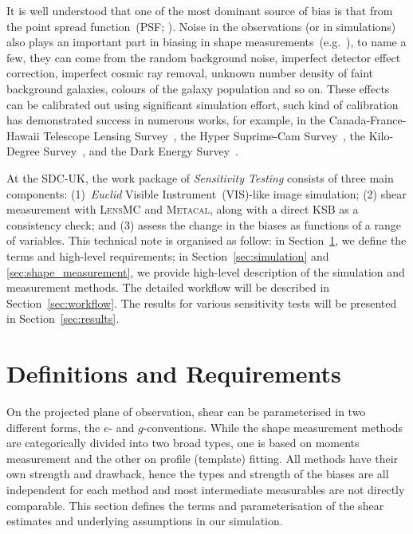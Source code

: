 \documentclass[11pt]{EuclidVIS}
\numberwithin{table}{section}
\numberwithin{figure}{section}
\begin{document}
It is well understood that one of the most dominant source of bias is that from the point spread
function~(PSF; \citealp{2008A&A...484...67P, 2013MNRAS.429..661M}). Noise in the observations (or
in simulations) also plays an important part in biasing in shape measurements~(e.g.\ \citealp{2012MNRAS.424.2757M}),
to name a few, they can come from the random background noise, imperfect detector effect correction,
imperfect cosmic ray removal, unknown number density of faint background galaxies, colours of the
galaxy population and so on. These effects can be calibrated out using significant simulation effort,
such kind of calibration has demonstrated success in numerous works, for example, in the
Canada-France-Hawaii Telescope Lensing Survey~\citep{2013MNRAS.429.2858M}, the Hyper Suprime-Cam
Survey~\citep{2018MNRAS.481.3170M}, the Kilo-Degree Survey~\citep{2021A&A...645A.105G}, and the
Dark Energy Survey~\citep{2022MNRAS.509.3371M}.

At the SDC-UK, the work package of \textit{Sensitivity Testing} consists of three main components:
(1)~\textit{Euclid} Visible Instrument~(VIS)-like image simulation; (2) shear measurement with
\textsc{LensMC} and \textsc{Metacal}, along with a direct \textsc{KSB} as
a consistency check; and (3) assess the change in the biases as functions of a range of variables.
This technical note is organised as follow: in Section~\ref{sec:definition_and_requirement}, we 
define the terms and high-level requirements; in Section~\ref{sec:simulation} and \ref{sec:shape_measurement},
we provide high-level description of the simulation and measurement methods. The detailed workflow
will be described in Section~\ref{sec:workflow}. The results for various sensitivity tests will
be presented in Section~\ref{sec:results}.

\section{Definitions and Requirements}
\label{sec:definition_and_requirement}
On the projected plane of observation, shear can be parameterised in two different forms, the $e$-
and $g$-conventions. While the shape measurement methods are categorically divided into two broad
types, one is based on moments measurement and the other on profile (template) fitting. All methods
have their own strength and drawback, hence the types and strength of the biases are all independent
for each method and most intermediate measurables are not directly comparable. This section defines
the terms and parameterisation of the shear estimates and underlying assumptions in our simulation.
\end{document}
